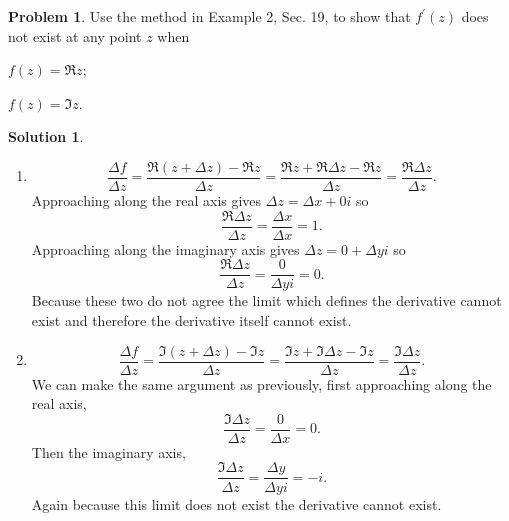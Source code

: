 \documentclass[10pt]{article}
\theoremstyle{definition}
\newtheorem{problem}{Problem}
\newtheorem{soln}{Solution}
\newcommand{\primed}[1]{#1^\prime}
\begin{document}
\begin{problem}
Use the method in Example 2, Sec. 19, to show that $\primed{f}(z)$ does not exist at any point
$z$ when
\begin{center}
  \begin{enumerate*}[label=(\alph*)]
    \item $f(z)=\Re z$;\qquad~
    \item $f(z)=\Im z$.
  \end{enumerate*}
\end{center}
\end{problem}
\begin{soln}~
  \begin{enumerate}[label=(\alph*)]
    \item $$\frac{\Delta f}{\Delta z}
            =\frac{\Re (z+\Delta z)- \Re z}{\Delta z}
            =\frac{\Re z+\Re \Delta z - \Re z}{\Delta z}
            =\frac{\Re \Delta z}{\Delta z}.$$
          Approaching along the real axis gives $\Delta z=\Delta x+0i$ so
          $$\frac{\Re \Delta z}{\Delta z}=\frac{\Delta x}{\Delta x}=1.$$
          Approaching along the imaginary axis gives $\Delta z = 0+\Delta yi$ so
          $$\frac{\Re \Delta z}{\Delta z}=\frac{0}{\Delta yi}=0.$$
          Because these two do not agree the limit which defines the derivative cannot exist
          and therefore the derivative itself cannot exist.
    \item $$\frac{\Delta f}{\Delta z}
            =\frac{\Im (z+\Delta z)- \Im z}{\Delta z}
            =\frac{\Im z+\Im \Delta z - \Im z}{\Delta z}
            =\frac{\Im \Delta z}{\Delta z}.$$
          We can make the same argument as previously, first approaching along the real axis,
          $$\frac{\Im \Delta z}{\Delta z}=\frac{0}{\Delta x}=0.$$
          Then the imaginary axis,
          $$\frac{\Im \Delta z}{\Delta z}=\frac{\Delta y}{\Delta yi}=-i.$$
          Again because this limit does not exist the derivative cannot exist.
  \end{enumerate}
\end{soln}
\end{document}
